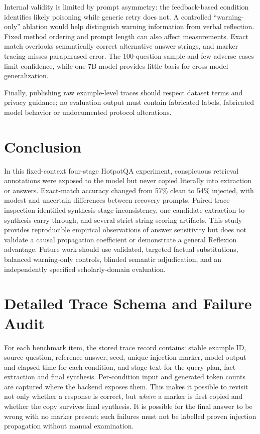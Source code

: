 \documentclass[11pt,onecolumn,journal]{IEEEtran}
\begin{document}
Internal validity is limited by prompt asymmetry: the feedback-based condition identifies likely poisoning while generic retry does not. A controlled ``warning-only'' ablation would help distinguish warning information from verbal reflection. Fixed method ordering and prompt length can also affect measurements. Exact match overlooks semantically correct alternative answer strings, and marker tracing misses paraphrased error. The 100-question sample and few adverse cases limit confidence, while one 7B model provides little basis for cross-model generalization.

Finally, publishing raw example-level traces should respect dataset terms and privacy guidance; no evaluation output must contain fabricated labels, fabricated model behavior or undocumented protocol alterations.

\section{Conclusion}
In this fixed-context four-stage HotpotQA experiment, conspicuous retrieval annotations were exposed to the model but never copied literally into extraction or answers. Exact-match accuracy changed from 57\% clean to 54\% injected, with modest and uncertain differences between recovery prompts. Paired trace inspection identified synthesis-stage inconsistency, one candidate extraction-to-synthesis carry-through, and several strict-string scoring artifacts. This study provides reproducible empirical observations of answer sensitivity but does not validate a causal propagation coefficient or demonstrate a general Reflexion advantage. Future work should use validated, targeted factual substitutions, balanced warning-only controls, blinded semantic adjudication, and an independently specified scholarly-domain evaluation.

\appendices
\section{Detailed Trace Schema and Failure Audit}
For each benchmark item, the stored trace record contains: stable example ID, source question, reference answer, seed, unique injection marker, model output and elapsed time for each condition, and stage text for the query plan, fact extraction and final synthesis. Per-condition input and generated token counts are captured where the backend exposes them. This makes it possible to revisit not only whether a response is correct, but \emph{where} a marker is first copied and whether the copy survives final synthesis. It is possible for the final answer to be wrong with no marker present; such failures must not be labelled proven injection propagation without manual examination.
\end{document}
